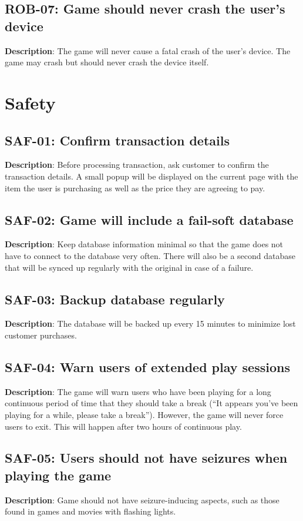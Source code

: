 \subsection{ROB-07: Game should never crash the user\textquoteright{}s device}
\textbf{Description}: The game will never cause a fatal crash of the user\textquoteright{}s
device. The game may crash but should never crash the device itself.
\section{Safety}
\subsection{SAF-01: Confirm transaction details}
\textbf{Description}: Before processing transaction, ask customer to confirm
the transaction details. A small popup will be displayed on the current
page with the item the user is purchasing as well as the price they
are agreeing to pay.
\subsection{SAF-02: Game will include a fail-soft database}
\textbf{Description}: Keep database information minimal so that the game does
not have to connect to the database very often. There will also be
a second database that will be synced up regularly with the original
in case of a failure.
\subsection{SAF-03: Backup database regularly}
\textbf{Description}: The database will be backed up every 15 minutes to minimize
lost customer purchases.
\subsection{SAF-04: Warn users of extended play sessions}
\textbf{Description}: The game will warn users who have been playing for a
long continuous period of time that they should take a break (\textquotedblleft{}It
appears you\textquoteright{}ve been playing for a while, please take
a break\textquotedblright{}). However, the game will never force users
to exit. This will happen after two hours of continuous play.
\subsection{SAF-05: Users should not have seizures when playing the game}
\textbf{Description}: Game should not have seizure-inducing aspects, such as
those found in games and movies with flashing lights.
